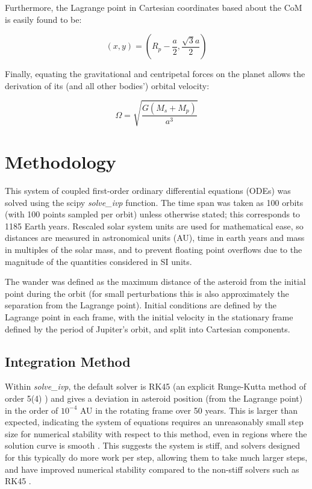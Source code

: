 \documentclass[11pt, a4paper,twocolumn]{article} %
\begin{document}
Furthermore, the Lagrange point in Cartesian coordinates based about the CoM is easily found to be:

\begin{equation}
(x,y) = \left( R_{p} - \frac{a}{2}, \frac{ \sqrt{3} a}{2} \right)
\end{equation}

Finally, equating the gravitational and centripetal forces on the planet allows the derivation of its (and all other bodies') orbital velocity:

\begin{equation}
\Omega = \sqrt{\frac{G (M_{s} + M_{p})}{a^{3}}}
\end{equation}

\section{Methodology}
This system of coupled first-order ordinary differential equations (ODEs) was solved using the scipy \textit{solve\_ivp} function. The time span was taken as 100 orbits (with 100 points sampled per orbit) unless otherwise stated; this corresponds to 1185 Earth years. Rescaled solar system units are used for mathematical ease, so distances are measured in astronomical units (AU), time in earth years and mass in multiples of the solar mass, and to prevent floating point overflows due to the magnitude of the quantities considered in SI units.

The wander was defined as the maximum distance of the asteroid from the initial point during the orbit (for small perturbations this is also approximately the separation from the Lagrange point).
Initial conditions are defined by the Lagrange point in each frame, with the initial velocity in the stationary frame defined by the period of Jupiter's orbit, and split into Cartesian components.

\subsection{Integration Method}
Within \textit{solve\_ivp}, the default solver is RK45 (an explicit Runge-Kutta method of order 5(4) \cite{Dormand1980}) and gives a deviation in asteroid position (from the Lagrange point) in the order of $ 10^{-4}$ AU in the rotating frame over 50 years. This is larger than expected, indicating the system of equations requires an unreasonably small step size for numerical stability with respect to this method, even in regions where the solution curve is smooth \cite{Lambert1991}. This suggests the system is stiff, and solvers designed for this typically do more work per step, allowing them to take much larger steps, and have improved numerical stability compared to the non-stiff solvers such as RK45 \cite{Byrne1987}. 
\end{document}
